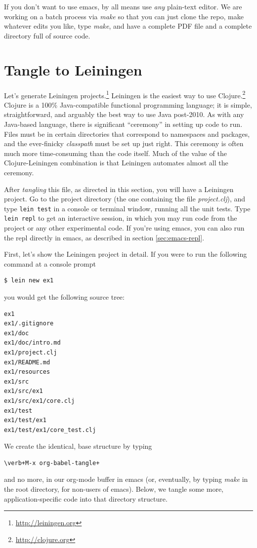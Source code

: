\documentclass[11pt]{article}
\begin{document}
If you don't want to use emacs, by all means use \emph{any} plain-text
editor. We are working on a batch process via \emph{make} so that you can
just clone the repo, make whatever edits you like, type \emph{make}, and
have a complete PDF file and a complete directory full of source
code.
\section{Tangle to Leiningen}
\label{sec-2}
Let's generate Leiningen projects.\footnote{\url{http://leiningen.org}}
Leiningen is the easiest way to use Clojure.\footnote{\url{http://clojure.org}}
Clojure is a 100\% Java-compatible functional programming language;
it is simple, straightforward, and arguably the best way to use Java
post-2010. As with any Java-based language, there is significant
``ceremony'' in setting up code to run. Files must be in certain
directories that correspond to namespaces and packages, and the
ever-finicky \emph{classpath} must be set up just right. This ceremony is
often much more time-consuming than the code itself. Much of the
value of the Clojure-Leiningen combination is that Leiningen
automates almost all the ceremony.

After \emph{tangling} this file, as directed in this section, you will
have a Leiningen project. Go to the project directory (the one
containing the file \emph{project.clj}), and type \verb|lein test| in a
console or terminal window, running all the unit tests. Type
\verb|lein repl| to get an interactive session, in which you may run
code from the project or any other experimental code. If you're
using emacs, you can also run the repl directly in emacs, as
described in section \ref{sec:emacs-repl}.

First, let's show the Leiningen project in detail. If you were to
run the following command at a console prompt
\begin{verbatim}
$ lein new ex1
\end{verbatim}
you would get the following source tree:
\begin{verbatim}
ex1
ex1/.gitignore
ex1/doc
ex1/doc/intro.md
ex1/project.clj
ex1/README.md
ex1/resources
ex1/src
ex1/src/ex1
ex1/src/ex1/core.clj
ex1/test
ex1/test/ex1
ex1/test/ex1/core_test.clj
\end{verbatim}
We create the identical, base structure by typing
\begin{verbatim}
\verb+M-x org-babel-tangle+
\end{verbatim}
and no more, in our org-mode buffer in emacs (or, eventually, by
typing \emph{make} in the root directory, for non-users of emacs). Below,
we tangle some more, application-specific code into that directory
structure.
\end{document}
